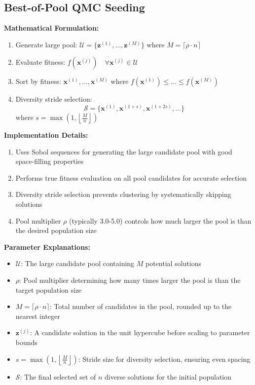 \documentclass[12pt,a4paper]{article}
\begin{document}
\subsection{Best-of-Pool QMC Seeding}
\textbf{Mathematical Formulation:}
\begin{enumerate}
\item Generate large pool: $\mathcal{U} = \{\bm{z}^{(1)}, \dots, \bm{z}^{(M)}\}$ where $M = \lceil \rho \cdot n \rceil$
\item Evaluate fitness: $f(\bm{x}^{(j)}) \quad \forall \bm{x}^{(j)} \in \mathcal{U}$
\item Sort by fitness: $\bm{x}^{(1)}, \dots, \bm{x}^{(M)}$ where $f(\bm{x}^{(1)}) \leq \dots \leq f(\bm{x}^{(M)})$
\item Diversity stride selection:
\begin{equation}
\mathcal{S} = \{\bm{x}^{(1)}, \bm{x}^{(1 + s)}, \bm{x}^{(1 + 2s)}, \dots\} \label{eq:best_pool_stride}
\end{equation}
where $s = \max\left(1, \left\lfloor \frac{M}{n} \right\rfloor \right)$
\end{enumerate}

\textbf{Implementation Details:}
\begin{enumerate}
\item Uses Sobol sequences for generating the large candidate pool with good space-filling properties
\item Performs true fitness evaluation on all pool candidates for accurate selection
\item Diversity stride selection prevents clustering by systematically skipping solutions
\item Pool multiplier $\rho$ (typically 3.0-5.0) controls how much larger the pool is than the desired population size
\end{enumerate}

\textbf{Parameter Explanations:}
\begin{itemize}
\item $\mathcal{U}$: The large candidate pool containing $M$ potential solutions
\item $\rho$: Pool multiplier determining how many times larger the pool is than the target population size
\item $M = \lceil \rho \cdot n \rceil$: Total number of candidates in the pool, rounded up to the nearest integer
\item $\bm{z}^{(j)}$: A candidate solution in the unit hypercube before scaling to parameter bounds
\item $s = \max\left(1, \left\lfloor \frac{M}{n} \right\rfloor \right)$: Stride size for diversity selection, ensuring even spacing
\item $\mathcal{S}$: The final selected set of $n$ diverse solutions for the initial population
\end{itemize}
\end{document}
